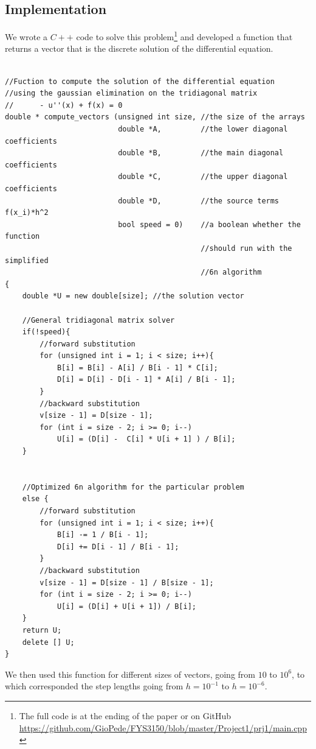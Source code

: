 \documentclass[10pt,a4paper,titlepage]{article}
\begin{document}
\subsection*{Implementation}
We wrote a $C++$ code to solve this problem\footnote{The full code is at the ending of the paper or on GitHub \url{https://github.com/GioPede/FYS3150/blob/master/Project1/prj1/main.cpp}} and developed a function that returns a vector that is the discrete solution of the differential equation. 

\begin{lstlisting}[title={Solve Tridiagonal Matrix}]

//Fuction to compute the solution of the differential equation
//using the gaussian elimination on the tridiagonal matrix
//      - u''(x) + f(x) = 0
double * compute_vectors (unsigned int size, //the size of the arrays
                          double *A,         //the lower diagonal coefficients 
                          double *B,         //the main diagonal coefficients 
                          double *C,         //the upper diagonal coefficients 
                          double *D,         //the source terms f(x_i)*h^2
                          bool speed = 0)    //a boolean whether the function 
                                             //should run with the simplified 
                                             //6n algorithm
{
	double *U = new double[size]; //the solution vector
	
	//General tridiagonal matrix solver
	if(!speed){
		//forward substitution
		for (unsigned int i = 1; i < size; i++){
			B[i] = B[i] - A[i] / B[i - 1] * C[i];
			D[i] = D[i] - D[i - 1] * A[i] / B[i - 1];
		}
		//backward substitution
		v[size - 1] = D[size - 1];
		for (int i = size - 2; i >= 0; i--)
			U[i] = (D[i] -  C[i] * U[i + 1] ) / B[i];
	}
	
	
	//Optimized 6n algorithm for the particular problem
	else {
		//forward substitution
		for (unsigned int i = 1; i < size; i++){
			B[i] -= 1 / B[i - 1];
			D[i] += D[i - 1] / B[i - 1];
		}	
		//backward substitution
		v[size - 1] = D[size - 1] / B[size - 1];
		for (int i = size - 2; i >= 0; i--)
			U[i] = (D[i] + U[i + 1]) / B[i];
	}	
	return U;
	delete [] U;
}

\end{lstlisting}

We then used this function for different sizes of vectors, going from $10$ to $10^6$, to which corresponded the step lengths going from $h = 10^{-1}$ to $h = 10^{-6}$.
\end{document}

